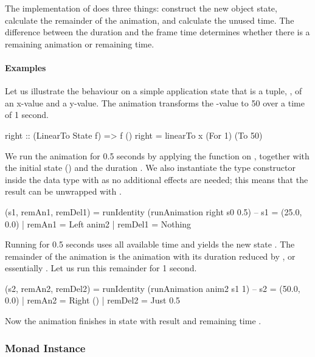 The  implementation of  does three things: construct
the new object state, calculate the remainder of the animation, and calculate
the unused time. The difference between the  duration and the
frame time determines whether there is a remaining  animation or
remaining time.

\paragraph{Examples}

Let us illustrate the behaviour on a simple application
state that is a tuple, , of an {x}-value and a {y}-value.
The  animation transforms the -value to 50 over a time of 1
second.

\begin{code}
right :: (LinearTo State f) => f ()
right = linearTo x (For 1) (To 50)
\end{code}

We run the animation for 0.5 seconds by applying the  function
on , together with the initial state () and the duration . We also instantiate the  type constructor  inside
the  data type with  as no additional effects are
needed; this means that the result can be unwrapped with
.

\begin{code}
(s1, remAn1, remDel1) = runIdentity (runAnimation right s0 0.5)
-- s1 = (25.0, 0.0) | remAn1 = Left anim2 | remDel1 = Nothing
\end{code}

Running  for 0.5 seconds uses all available time and yields the new state
. The remainder of
the animation is the  animation with its duration reduced by , or essentially . Let us run this
remainder for 1 second.

\begin{code}
(s2, remAn2, remDel2) = runIdentity (runAnimation anim2 s1 1)
-- s2 = (50.0, 0.0) | remAn2 = Right () | remDel2 = Just 0.5
\end{code}

Now the animation finishes in state  with result \hs{()} and remaining time .

\subsubsection{Monad Instance}

